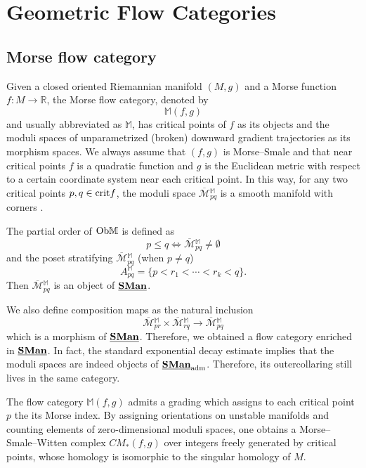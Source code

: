 \documentclass[reqno, 10pt]{amsart}
\numberwithin{equation}{section}
\numberwithin{equation}{section}
\theoremstyle{definition}
\theoremstyle{remark}
\newcommand{\beqn}{\begin{equation*}}
\newcommand{\eeqn}{\end{equation*}}
\newcommand{\ov}{\overline}
\newcommand{\mb}{\mathbb}
\newcommand{\mc}{\mathcal}
\newcommand{\uds}[1]{\underline{\smash{#1}}}
\begin{document}
\section{Geometric Flow Categories}
\label{subsection_example}


\subsection{Morse flow category}

Given a closed oriented Riemannian manifold $(M, g)$ and a Morse function $f: M \to {\mb R}$, the Morse flow category, denoted by 
\beqn
\mb{M}(f, g)
\eeqn
and usually abbreviated as $\mb{M}$, has critical points of $f$ as its objects and the moduli spaces of unparametrized (broken) downward gradient trajectories as its morphism spaces. We always assume that $(f, g)$ is Morse--Smale and that near critical points $f$ is a quadratic function and $g$ is the Euclidean metric with respect to a certain coordinate system near each critical point. In this way, for any two critical points $p,q\in {\rm crit} f$, the moduli space $\ov{\mc M}{}_{pq}^{\mb M}$ is a smooth manifold with corners \cite{Wehrheim_Morse}.

The partial order of ${\rm Ob}\mb{M}$ is defined as
\beqn
p \leq q \Longleftrightarrow \ov{\mc M}{}_{pq}^{\mb M} \neq \emptyset
\eeqn
and the poset stratifying $\ov{\mc M}{}_{pq}^{\mb M}$ (when $p \neq q$)
\beqn
A_{pq}^{\mb M} = \{ p < r_1 < \cdots < r_k < q\}.
\eeqn
Then $\ov{\mc M}{}_{pq}^{\mb M}$ is an object of $\uds{\bf SMan}$.

We also define composition maps as the natural inclusion 
\beqn
\ov{\mc M}{}_{pr}^{\mb M} \times \ov{\mc M}{}_{rq}^{\mb M} \to \ov{\mc M}{}_{pq}^{\mb M}
\eeqn
which is a morphism of $\uds{\bf SMan}$. Therefore, we obtained a flow category enriched in $\uds{\bf SMan}$. In fact, the standard exponential decay estimate implies that the moduli spaces are indeed objects of $\uds{\bf SMan}_{\rm adm}$. Therefore, its outercollaring still lives in the same category.

The flow category $\mb{M}(f, g)$ admits a grading which assigns to each critical point $p$ the its Morse index. By assigning orientations on unstable manifolds and counting elements of zero-dimensional moduli spaces, one obtains a Morse--Smale--Witten complex $CM_*(f, g)$ over integers freely generated by critical points, whose homology is isomorphic to the singular homology of $M$.
\end{document}
